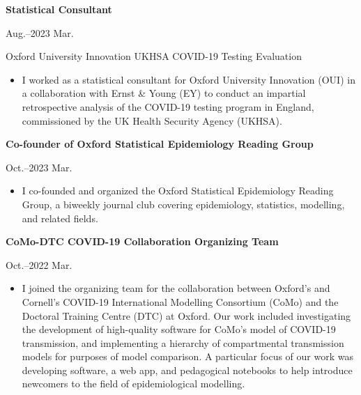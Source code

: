 \documentclass[11pt]{article}
\begin{document}
\vspace{0.2cm}


\vspace{0.1mm}
\noindent\parbox{.75\textwidth}{\raggedright \textbf{Statistical Consultant}}
\parbox{.25\textwidth}{ Aug.--2023 Mar.}
Oxford University Innovation UKHSA COVID-19 Testing Evaluation
\vspace{-.25cm}
\begin{itemize}
\setlength{\itemsep}{4pt}
\setlength{\parskip}{0pt}
\setlength{\parsep}{0pt}
\item I worked as a statistical consultant for Oxford University Innovation (OUI) in a collaboration with Ernst \& Young (EY) to conduct an impartial retrospective analysis of the COVID-19 testing program in England, commissioned by the UK Health Security Agency (UKHSA).
\end{itemize}

\vspace{0.2cm}


\noindent\parbox{.75\textwidth}{\raggedright \textbf{Co-founder of Oxford Statistical Epidemiology Reading Group\\ \vspace{.1cm}}}
\parbox{.25\textwidth}{ Oct.--2023 Mar.}
\vspace{-.65cm}
\begin{itemize}
\setlength{\itemsep}{4pt}
\setlength{\parskip}{0pt}
\setlength{\parsep}{0pt}
\item I co-founded and organized the Oxford Statistical Epidemiology Reading Group, a biweekly journal club covering epidemiology, statistics, modelling, and related fields.
\end{itemize}


\vspace{0.2cm}


\noindent\parbox{.75\textwidth}{\raggedright \textbf{CoMo-DTC COVID-19 Collaboration Organizing Team}}
\parbox{.25\textwidth}{ Oct.--2022 Mar.}
\vspace{-.65cm}
\begin{itemize}
\setlength{\itemsep}{4pt}
\setlength{\parskip}{0pt}
\setlength{\parsep}{0pt}
\item I joined the organizing team for the collaboration between Oxford's and Cornell's COVID-19 International Modelling Consortium (CoMo) and the Doctoral Training Centre (DTC) at Oxford. Our work included investigating the development of high-quality software for CoMo's model of COVID-19 transmission, and implementing a hierarchy of compartmental transmission models for purposes of model comparison. A particular focus of our work was developing software, a web app, and pedagogical notebooks to help introduce newcomers to the field of epidemiological modelling.
\end{itemize}
\end{document}
